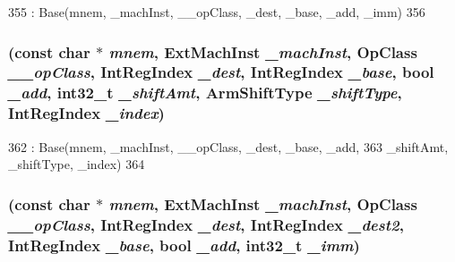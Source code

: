 \begin{DoxyCode}
355         : Base(mnem, _machInst, __opClass, _dest, _base, _add, _imm)
356     {}
\end{DoxyCode}
\hypertarget{classArmISA_1_1MemoryOffset_a057cba0d375dad66df07fb02c4098c23}{
\subsubsection[{MemoryOffset}]{ (const char $\ast$ {\em mnem}, \/  ExtMachInst {\em \_\-machInst}, \/  OpClass {\em \_\-\_\-opClass}, \/  {\bf IntRegIndex} {\em \_\-dest}, \/  {\bf IntRegIndex} {\em \_\-base}, \/  bool {\em \_\-add}, \/  int32\_\-t {\em \_\-shiftAmt}, \/  {\bf ArmShiftType} {\em \_\-shiftType}, \/  {\bf IntRegIndex} {\em \_\-index})}}
\label{classArmISA_1_1MemoryOffset_a057cba0d375dad66df07fb02c4098c23}



\begin{DoxyCode}
362         : Base(mnem, _machInst, __opClass, _dest, _base, _add,
363                 _shiftAmt, _shiftType, _index)
364     {}
\end{DoxyCode}
\hypertarget{classArmISA_1_1MemoryOffset_a9ee5e299a2e1a4b8f9661c5b865471cb}{
\subsubsection[{MemoryOffset}]{ (const char $\ast$ {\em mnem}, \/  ExtMachInst {\em \_\-machInst}, \/  OpClass {\em \_\-\_\-opClass}, \/  {\bf IntRegIndex} {\em \_\-dest}, \/  {\bf IntRegIndex} {\em \_\-dest2}, \/  {\bf IntRegIndex} {\em \_\-base}, \/  bool {\em \_\-add}, \/  int32\_\-t {\em \_\-imm})}}
\label{classArmISA_1_1MemoryOffset_a9ee5e299a2e1a4b8f9661c5b865471cb}



